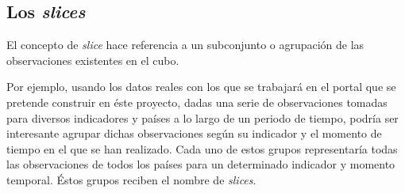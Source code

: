 \subsection{Los \textit{slices}}
El concepto de \textit{slice} hace referencia a un subconjunto o agrupación de las observaciones existentes en el cubo.

Por ejemplo, usando los datos reales con los que se trabajará en el portal que se pretende construir en éste proyecto, dadas una serie de observaciones tomadas para diversos indicadores y países a lo largo de un periodo de tiempo, podría ser interesante agrupar dichas observaciones según su indicador y el momento de tiempo en el que se han realizado.  Cada uno de estos grupos representaría todas las observaciones de todos los países para un determinado indicador y momento temporal.  Éstos grupos reciben el nombre de \textit{slices}.

